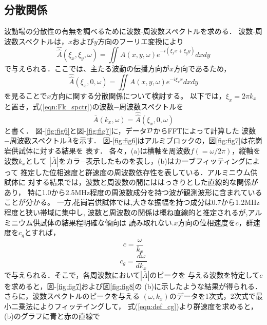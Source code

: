 \subsection{分散関係}
波動場の分散性の有無を調べるために波数-周波数スペクトルを求める．
波数-周波数スペクトルは，$x$および$y$方向のフーリエ変換により
\begin{equation}
	\hat{\hat {A}}(\xi_x,\xi_y,\omega) =
	\iint A(x,y,\omega)e^{-i(\xi_x x +\xi_y y)}dxdy
	\label{eqn:Fkk_spctr}
\end{equation}
で与えられる．ここでは、主たる波動の伝播方向が$x$方向であるため，
\begin{equation}
	\hat{\hat {A}}(\xi_x,0,\omega) =
	\iint A(x,y,\omega)e^{-i\xi_x x}dxdy
	\label{eqn:Fk_spctr}
\end{equation}
を見ることで$x$方向に関する分散関係について検討する。
以下では，$\xi_x=2\pi k_x$と置き，式(\ref{eqn:Fk_spctr})の波数−周波数スペクトルを
\begin{equation}
	\bar{A}(k_x,\omega)=\hat{\hat {A}}(\xi_x,0,\omega)
	\label{eqn:def_Ak}
\end{equation}
と書く．
図-\ref{fig:fig6}と図-\ref{fig:fig7}に，データ$\cal D$からFFTによって計算した
波数−周波数スペクトル$\bar{A}$を示す．
図-\ref{fig:fig6}はアルミブロックの，図\ref{fig:fig7}は花崗岩供試体に対する結果を
表す．
各々，(a)は横軸を周波数$f(=\omega/2\pi)$，縦軸を波数$k_x$として
$\left| \bar{A}\right|$をカラ−表示したものを表し，(b)はカーブフィッティングによって
推定した位相速度と群速度の周波数依存性を表している．アルミニウム供試体に
対する結果では，波数と周波数の間にははっきりとした直線的な関係があり，
特に1.0から2.5MHz程度の周波数成分を持つ波が観測波形に含まれていることが分かる。
一方,花崗岩供試体では,大きな振幅を持つ成分は0.7から1.2MHz程度と狭い帯域に集中し,
波数と周波数の関係は概ね直線的と推定されるが,アルミニウム供試体の結果程明確な傾向は
読み取れない.$x$方向の位相速度を$c$，群速度を$c_g$とすれば，
\begin{equation}
	c=\frac{\omega}{k_x}
	\label{eqn:def_c}
\end{equation}
\begin{equation}
	c_g=\frac{d\omega}{dk_x}
	\label{eqn:def_cg}
\end{equation}
で与えられる．そこで，各周波数において$|\bar A|$のピークを
与える波数を特定して$c$を求めると，図-\ref{fig:fig7}および図\ref{fig:fig8}の
(b)に示したような結果が得られる．さらに，波数スペクトルのピークを与える
$(\omega,k_x)$のデータを1次式，2次式で最小二乗法によりフィッテイングして，
式(\ref{eqn:def_cg})より群速度を求めると，(b)のグラフに青と赤の直線で
